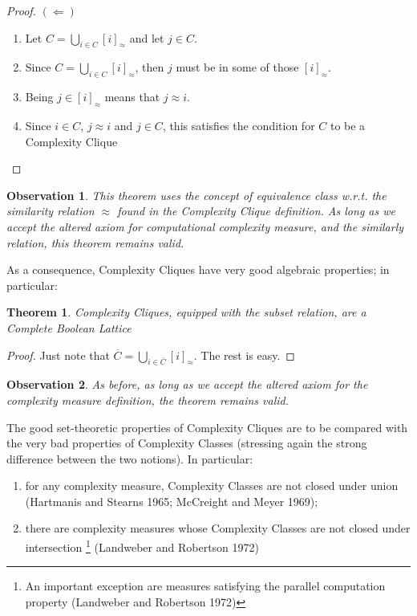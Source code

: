 \documentclass[10pt, a4paper, oneside, titlepage, draft]{article}
\newtheorem{observation}{Observation}[shrd]
\newtheorem{theorem}[shrd]{Theorem}
\begin{document}
\begin{proof}   $(\Leftarrow)$
    \begin{enumerate}
        \item Let $C = \bigcup_{i \in C}[i]_{\approx}$ and let $j \in C$.
        \item Since $C = \bigcup_{i \in C}[i]_{\approx}$, then $j$ must be in some of those $[i]_{\approx}$.
        \item Being $j \in [i]_{\approx}$ means that $j \approx i$.
        \item Since $i \in C$, $j \approx i$ and $j \in C$, this satisfies the condition for $C$ to be a Complexity Clique
    \end{enumerate}
\end{proof}

\begin{observation}
    This theorem uses the concept of equivalence class w.r.t. the similarity relation $\approx$ found in the Complexity Clique definition. As long as we accept the altered axiom for computational complexity measure, and the similarly relation, this theorem remains valid.
\end{observation}

As a consequence, Complexity Cliques have very good algebraic properties; in particular:
\begin{theorem}
    Complexity Cliques, equipped with the subset relation, are a Complete Boolean Lattice
\end{theorem}
\begin{proof}
    Just note that $\overline{C} = \bigcup_{i \in \overline{C}}[i]_{\approx}$. The rest is easy.
\end{proof}

\begin{observation}
    As before, as long as we accept the altered axiom for the complexity measure definition, the theorem remains valid.
\end{observation}

The good set-theoretic properties of Complexity Cliques are to be compared with the very bad properties of Complexity Classes (stressing again the strong difference between the two notions). In particular:
\begin{enumerate}
    \item for any complexity measure, Complexity Classes are not closed under union (Hartmanis and Stearns 1965; McCreight and Meyer 1969);
    \item there are complexity measures whose Complexity Classes are not closed under intersection \footnote{An important exception are measures satisfying the parallel computation
    property (Landweber and Robertson 1972)} (Landweber and Robertson 1972)
\end{enumerate}
\end{document}
